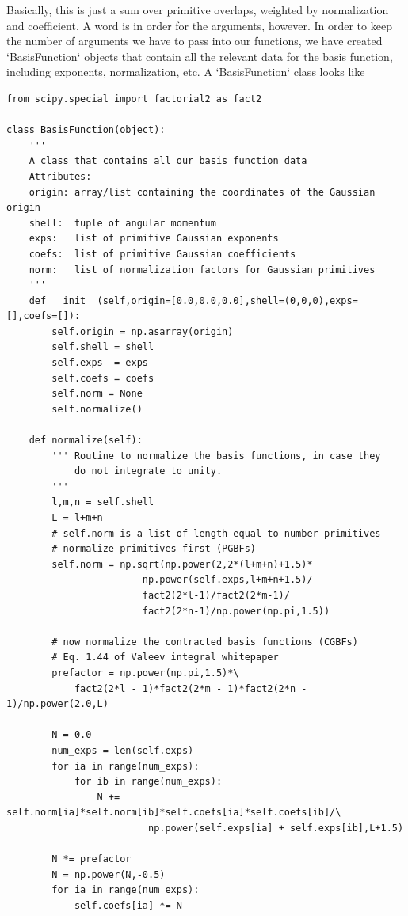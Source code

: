 Basically, this is just a sum over primitive overlaps, weighted by
normalization and coefficient. A word is in order for the arguments,
however. In order to keep the number of arguments we have to pass into
our functions, we have created `BasisFunction` objects that contain all
the relevant data for the basis function, including exponents,
normalization, etc. A `BasisFunction` class looks like

\begin{lstlisting}[style=MyPython]
from scipy.special import factorial2 as fact2

class BasisFunction(object):
    ''' 
    A class that contains all our basis function data
    Attributes:
    origin: array/list containing the coordinates of the Gaussian origin
    shell:  tuple of angular momentum
    exps:   list of primitive Gaussian exponents
    coefs:  list of primitive Gaussian coefficients
    norm:   list of normalization factors for Gaussian primitives
    '''
    def __init__(self,origin=[0.0,0.0,0.0],shell=(0,0,0),exps=[],coefs=[]):
        self.origin = np.asarray(origin)
        self.shell = shell
        self.exps  = exps
        self.coefs = coefs
        self.norm = None
        self.normalize()

    def normalize(self):
        ''' Routine to normalize the basis functions, in case they
            do not integrate to unity.
        '''
        l,m,n = self.shell
        L = l+m+n
        # self.norm is a list of length equal to number primitives
        # normalize primitives first (PGBFs)
        self.norm = np.sqrt(np.power(2,2*(l+m+n)+1.5)*
                        np.power(self.exps,l+m+n+1.5)/
                        fact2(2*l-1)/fact2(2*m-1)/
                        fact2(2*n-1)/np.power(np.pi,1.5))

        # now normalize the contracted basis functions (CGBFs)
        # Eq. 1.44 of Valeev integral whitepaper
        prefactor = np.power(np.pi,1.5)*\
            fact2(2*l - 1)*fact2(2*m - 1)*fact2(2*n - 1)/np.power(2.0,L)

        N = 0.0
        num_exps = len(self.exps)
        for ia in range(num_exps):
            for ib in range(num_exps):
                N += self.norm[ia]*self.norm[ib]*self.coefs[ia]*self.coefs[ib]/\
                         np.power(self.exps[ia] + self.exps[ib],L+1.5)

        N *= prefactor
        N = np.power(N,-0.5)
        for ia in range(num_exps):
            self.coefs[ia] *= N
\end{lstlisting}

